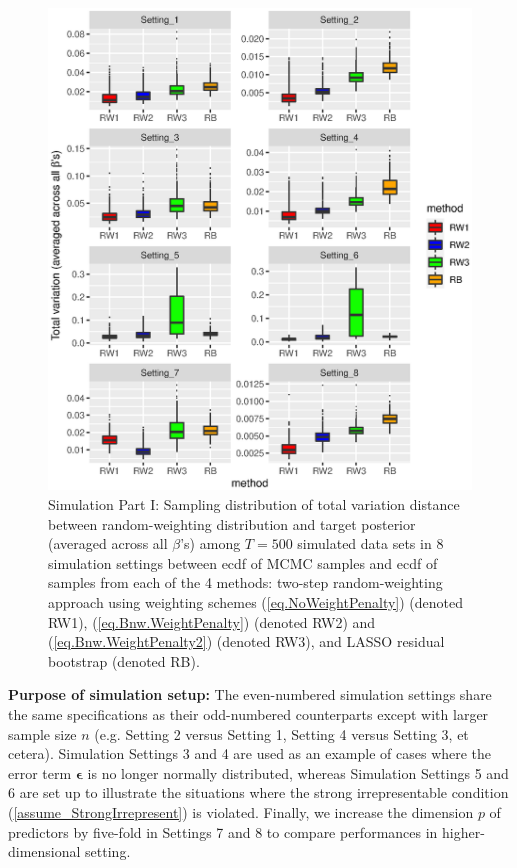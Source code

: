 \documentclass[ejs,authoryear,linksfromyear]{imsart}
\numberwithin{equation}{section}
\theoremstyle{plain}
\begin{document}
\begin{figure}[!]
	\centering
	\includegraphics[scale=0.8]{simul1_TV}
	\caption{Simulation Part I: Sampling distribution of total variation distance between random-weighting distribution and target posterior (averaged across all $\beta$'s) among $T = 500$ simulated data sets in 8 simulation settings between ecdf of MCMC samples and ecdf of samples from each of the 4 methods: two-step random-weighting approach using weighting schemes (\ref{eq.NoWeightPenalty}) (denoted RW1), (\ref{eq.Bnw.WeightPenalty}) (denoted RW2) and (\ref{eq.Bnw.WeightPenalty2}) (denoted RW3), and LASSO residual bootstrap (denoted RB).}
	\label{fig:simul1_TV}
\end{figure}  

\textbf{Purpose of simulation setup:} The even-numbered simulation settings share the same specifications as their odd-numbered counterparts except with larger sample size $n$ (e.g. Setting 2 versus Setting 1, Setting 4 versus Setting 3, et cetera). Simulation Settings 3 and 4 are used as an example of cases where the error term $\bm{\epsilon}$ is no longer normally distributed, whereas Simulation Settings 5 and 6 are set up to illustrate the situations where the strong irrepresentable condition (\ref{assume_StrongIrrepresent}) is violated. Finally, we increase the dimension $p$ of predictors by five-fold in Settings 7 and 8 to compare performances in higher-dimensional setting.     
\end{document}
